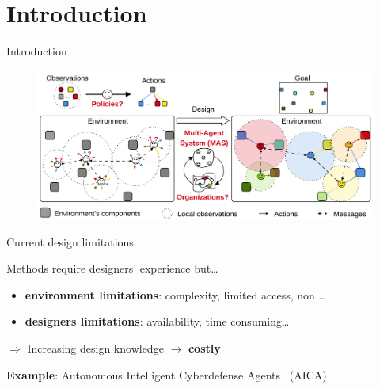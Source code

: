 

\section{Introduction}
\begin{frame}[allowframebreaks]{Introduction}

    \begin{figure}
        \includegraphics[width=0.9\linewidth]{figures/problem_illustration.png}
    \end{figure}

    \begin{alertblock}{Current design limitations}

        Methods require designers' experience but\dots

        \begin{itemize}
            \item \textbf{environment limitations}: complexity, limited access, non \dots
            \item \textbf{designers limitations}: availability, time consuming\dots
        \end{itemize}
        \vspace{1ex}
        $\Longrightarrow$ Increasing design knowledge $\rightarrow$ \textbf{costly}
    \end{alertblock}

    \begin{exampleblock}{\textbf{Example}: Autonomous Intelligent Cyberdefense Agents~\cite{Kott2023} (AICA)}


\end{exampleblock}
\end{frame}
